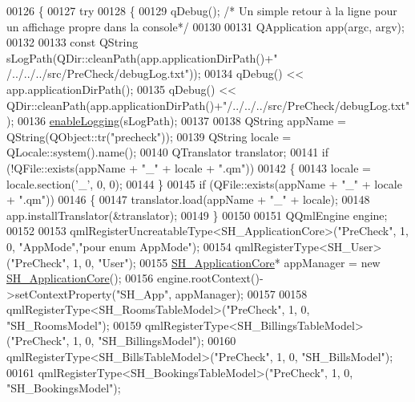 \begin{DoxyCode}
{00126 \{
00127     \textcolor{keywordflow}{try}
00128     \{
00129         qDebug();  \textcolor{comment}{/* Un simple retour à la ligne pour un affichage propre dans la console*/}
00130 
00131         QApplication app(argc, argv);
00132 
00133         \textcolor{keyword}{const} QString sLogPath(QDir::cleanPath(app.applicationDirPath()+\textcolor{stringliteral}{"
      /../../../src/PreCheck/debugLog.txt"}));
00134         qDebug() << app.applicationDirPath();
00135         qDebug() << QDir::cleanPath(app.applicationDirPath()+\textcolor{stringliteral}{"/../../../src/PreCheck/debugLog.txt"});
00136         \hyperlink{main_8cpp_ac3c79e35c4fc5c50939ae90485e1483f}{enableLogging}(sLogPath);
00137 
00138         QString appName = QString(QObject::tr(\textcolor{stringliteral}{"precheck"}));
00139         QString locale = QLocale::system().name();
00140         QTranslator translator;
00141         \textcolor{keywordflow}{if} (!QFile::exists(appName + \textcolor{stringliteral}{"\_"} + locale + \textcolor{stringliteral}{".qm"}))
00142         \{
00143             locale = locale.section(\textcolor{charliteral}{'\_'}, 0, 0);
00144         \}
00145         \textcolor{keywordflow}{if} (QFile::exists(appName + \textcolor{stringliteral}{"\_"} + locale + \textcolor{stringliteral}{".qm"}))
00146         \{
00147             translator.load(appName + \textcolor{stringliteral}{"\_"} + locale);
00148             app.installTranslator(&translator);
00149         \}
00150 
00151         QQmlEngine engine;
00152 
00153         qmlRegisterUncreatableType<SH\_ApplicationCore>(\textcolor{stringliteral}{"PreCheck"}, 1, 0, \textcolor{stringliteral}{"AppMode"},\textcolor{stringliteral}{"pour enum AppMode"});
00154         qmlRegisterType<SH\_User>(\textcolor{stringliteral}{"PreCheck"}, 1, 0, \textcolor{stringliteral}{"User"});
00155         \hyperlink{classSH__ApplicationCore}{SH\_ApplicationCore}* appManager = \textcolor{keyword}{new} 
      \hyperlink{classSH__ApplicationCore}{SH\_ApplicationCore}();
00156         engine.rootContext()->setContextProperty(\textcolor{stringliteral}{"SH\_App"}, appManager);
00157 
00158         qmlRegisterType<SH\_RoomsTableModel>(\textcolor{stringliteral}{"PreCheck"}, 1, 0, \textcolor{stringliteral}{"SH\_RoomsModel"});
00159         qmlRegisterType<SH\_BillingsTableModel>(\textcolor{stringliteral}{"PreCheck"}, 1, 0, \textcolor{stringliteral}{"SH\_BillingsModel"});
00160         qmlRegisterType<SH\_BillsTableModel>(\textcolor{stringliteral}{"PreCheck"}, 1, 0, \textcolor{stringliteral}{"SH\_BillsModel"});
00161         qmlRegisterType<SH\_BookingsTableModel>(\textcolor{stringliteral}{"PreCheck"}, 1, 0, \textcolor{stringliteral}{"SH\_BookingsModel"});
}
\end{DoxyCode}
